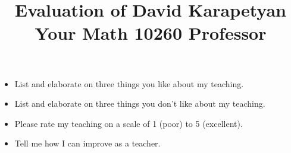 \documentclass[12pt]{article}
\begin{document}
\title{ \large{
Evaluation of David Karapetyan \\
Your Math 10260 Professor \\
}}
\author{}
\date{}
\maketitle
\thispagestyle{empty}
\begin{itemize}

	\item List and elaborate on three things you like about my teaching.
		\vspace{4cm}

	\item List and elaborate on three things you don't like about my teaching.
		\vspace{4cm}

	\item Please rate my teaching on a scale of 1 (poor) to 5 (excellent).
		\vspace{4cm}


	\item Tell me how I can improve as a teacher. 
\end{itemize}
\end{document}
